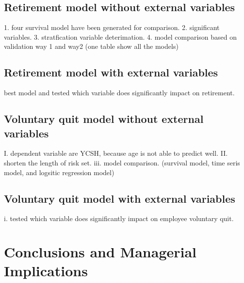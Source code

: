 \documentclass[12pt,letterpaper]{article}
\begin{document}
\subsection{Retirement model without external variables}
   1. four survival model have been generated for comparison.
   2. significant variables.
   3. stratfication variable deterimation.
   4. model comparison based on validation way 1 and way2 (one table show all the models)
\subsection{Retirement model with external variables}
     best model and tested which variable does significantly impact on retirement.
\subsection{Voluntary quit model without external variables}
     I. dependent variable are YCSH, because age is not able to predict well.
     II. shorten the length of risk set.
     iii. model comparison. (survival model, time seris model, and logsitic regression model)
\subsection{Voluntary quit model with external variables}
    i. tested which variable does significantly impact on employee voluntary quit.


\section{Conclusions and Managerial Implications} 


	
\end{document}
